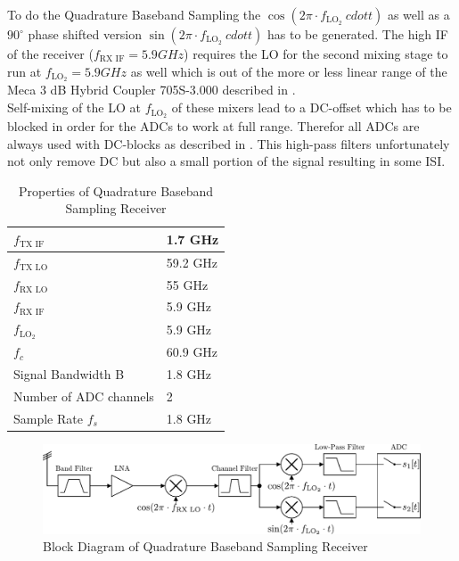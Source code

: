 To do the Quadrature Baseband Sampling the
$\cos(2\pi \cdot f_{\text{LO}_2} \ cdot t)$ as well as a $90^\circ$
phase shifted version $\sin(2\pi \cdot f_{\text{LO}_2} \ cdot t)$ has to be
generated.
The high \gls{IF} of the receiver ($f_{\text{RX IF}} = 5.9 GHz$) requires
the \gls{LO} for the second mixing stage to run at $f_{\text{LO}_2} = 5.9 GHz$
as well which is out of the more or less linear range of the
Meca 3 dB Hybrid Coupler 705S-3.000 described in . \\

Self-mixing of the \gls{LO} at $f_{\text{LO}_2}$ of these mixers lead
to a \acrshort{DC}-offset which has to be blocked in order for the
\glspl{ADC} to work at full range.
Therefor all \glspl{ADC} are always used with \acrshort{DC}-blocks as described
in . This high-pass filters unfortunately
not only remove \acrshort{DC} but also a small portion of the signal
resulting in some \gls{ISI}. \\

\begin{table}[h]
  \centering
  \begin{tabular}{|l|l|}
    \hline
    $f_{\text{TX IF}}$              & 1.7 GHz \\ \hline
    $f_{\text{TX LO}}$              & 59.2 GHz \\ \hline
    $f_{\text{RX LO}}$              & 55 GHz \\ \hline
    $f_{\text{RX IF}}$              & 5.9 GHz \\ \hline
    $f_{\text{LO}_2}$               & 5.9 GHz \\ \hline
    $f_c$                         & 60.9 GHz \\ \hline
    Signal Bandwidth B           & 1.8 GHz \\ \hline
    Number of \gls{ADC} channels & 2 \\ \hline
    Sample Rate $f_s$ & 1.8 GHz \\ \hline
  \end{tabular}
  \caption{Properties of Quadrature Baseband Sampling Receiver}
  \label{tab:rx_0}
\end{table}

\begin{figure}[h!]
  \centering
  \includegraphics[width=\textwidth]{figures/rx_0_bd}
  \caption{Block Diagram of Quadrature Baseband Sampling Receiver}
  \label{fig:rx_0_bd}
\end{figure}

